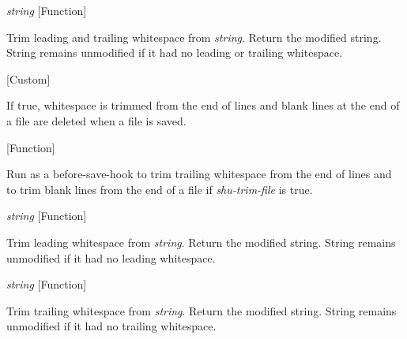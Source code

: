 \vspace{1em}
\noindent
{}
\usebox{\funcname}\emph{string}
 \hfill [Function]

\begin{doc-string}
Trim leading and trailing whitespace from \emph{string}.  Return the modified
string.  String remains unmodified if it had no leading or trailing whitespace.
\end{doc-string}

\vspace{1em}
\noindent
{}
\usebox{\funcname}
 \hfill [Custom]

\begin{doc-string}
If true, whitespace is trimmed from the end of lines and blank lines at the
end of a file are deleted when a file is saved.
\end{doc-string}

\vspace{1em}
\noindent
{}
\usebox{\funcname}
 \hfill [Function]

\begin{doc-string}
Run as a before-save-hook to trim trailing whitespace from the end of lines and
to trim blank lines from the end of a file if \emph{shu-trim-file} is true.
\end{doc-string}

\vspace{1em}
\noindent
{}
\usebox{\funcname}\emph{string}
 \hfill [Function]

\begin{doc-string}
Trim leading whitespace from \emph{string}.  Return the modified string.  String
remains unmodified if it had no leading whitespace.
\end{doc-string}

\vspace{1em}
\noindent
{}
\usebox{\funcname}\emph{string}
 \hfill [Function]

\begin{doc-string}
Trim trailing whitespace from \emph{string}.  Return the modified string.  String
remains unmodified if it had no trailing whitespace.
\end{doc-string}

